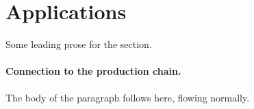 \section{Applications}

Some leading prose for the section.

\paragraph{Connection to the production chain.}

The body of the paragraph follows here, flowing normally.
